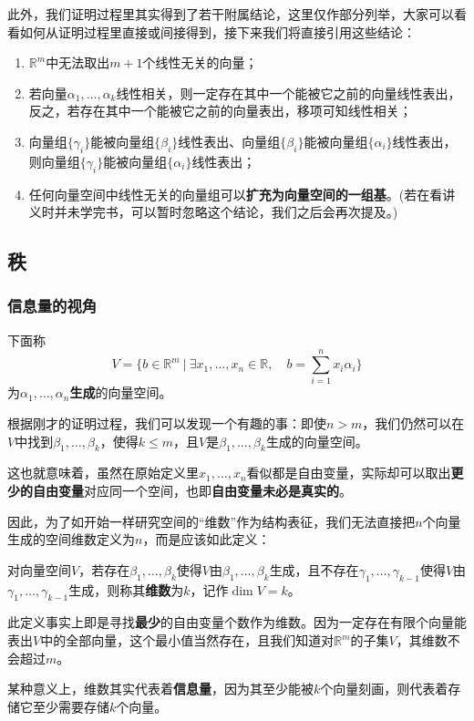 \documentclass[a4paper,UTF8,fontset=windows]{ctexart}
\newcommand*{\note}{\noindent *}
\begin{document}
此外，我们证明过程里其实得到了若干附属结论，这里仅作部分列举，大家可以看看如何从证明过程里直接或间接得到，接下来我们将直接引用这些结论：
\begin{enumerate}
    \item $\mathbb{R}^m$中无法取出$m+1$个线性无关的向量；
    \item 若向量$\alpha_1,\dots,\alpha_k$线性相关，则一定存在其中一个能被它之前的向量线性表出，反之，若存在其中一个能被它之前的向量表出，移项可知线性相关；
    \item 向量组$\{\gamma_i\}$能被向量组$\{\beta_i\}$线性表出、向量组$\{\beta_i\}$能被向量组$\{\alpha_i\}$线性表出，则向量组$\{\gamma_i\}$能被向量组$\{\alpha_i\}$线性表出；
    \item 任何向量空间中线性无关的向量组可以\textbf{扩充为向量空间的一组基}。(若在看讲义时并未学完书，可以暂时忽略这个结论，我们之后会再次提及。)
\end{enumerate}

\subsection{秩}
\subsubsection{信息量的视角}
下面称
$$V=\bigg\{b\in\mathbb{R}^m\ \bigg|\ \exists x_1,\dots,x_n\in\mathbb{R},\quad b=\sum_{i=1}^nx_i\alpha_i\bigg\}$$
为$\alpha_1,\dots,\alpha_n$\textbf{生成}的向量空间。

根据刚才的证明过程，我们可以发现一个有趣的事：即使$n>m$，我们仍然可以在$V$中找到$\beta_1,\dots,\beta_k$，使得$k\le m$，且$V$是$\beta_1,\dots,\beta_k$生成的向量空间。

这也就意味着，虽然在原始定义里$x_1,\dots,x_n$看似都是自由变量，实际却可以取出\textbf{更少的自由变量}对应同一个空间，也即\textbf{自由变量未必是真实的}。

因此，为了如开始一样研究空间的``维数''作为结构表征，我们无法直接把$n$个向量生成的空间维数定义为$n$，而是应该如此定义：

对向量空间$V$，若存在$\beta_1,\dots,\beta_k$使得$V$由$\beta_1,\dots,\beta_k$生成，且不存在$\gamma_1,\dots,\gamma_{k-1}$使得$V$由$\gamma_1,\dots,\gamma_{k-1}$生成，则称其\textbf{维数}为$k$，记作$\dim V=k$。

此定义事实上即是寻找\textbf{最少}的自由变量个数作为维数。因为一定存在有限个向量能表出$V$中的全部向量，这个最小值当然存在，且我们知道对$\mathbb{R}^m$的子集$V$，其维数不会超过$m$。

\note 某种意义上，维数其实代表着\textbf{信息量}，因为其至少能被$k$个向量刻画，则代表着存储它至少需要存储$k$个向量。
\end{document}
